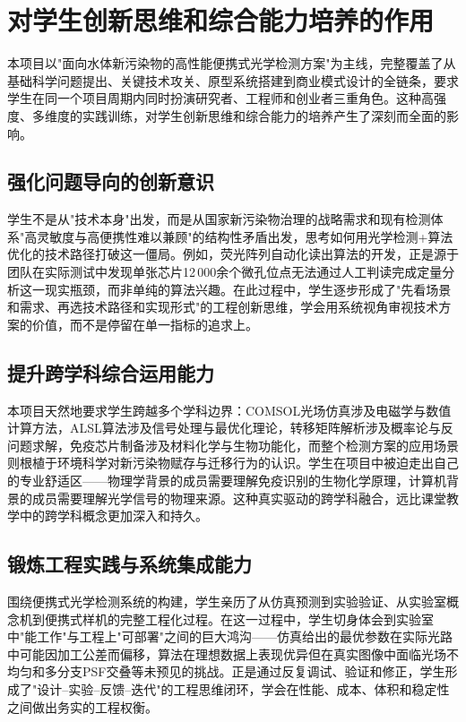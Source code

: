 \documentclass[12pt,a4paper]{article}
\begin{document}
\section{对学生创新思维和综合能力培养的作用}

本项目以"面向水体新污染物的高性能便携式光学检测方案"为主线，完整覆盖了从基础科学问题提出、关键技术攻关、原型系统搭建到商业模式设计的全链条，要求学生在同一个项目周期内同时扮演研究者、工程师和创业者三重角色。这种高强度、多维度的实践训练，对学生创新思维和综合能力的培养产生了深刻而全面的影响。

\subsection{强化问题导向的创新意识}

学生不是从"技术本身"出发，而是从国家新污染物治理的战略需求和现有检测体系"高灵敏度与高便携性难以兼顾"的结构性矛盾出发，思考如何用光学检测+算法优化的技术路径打破这一僵局。例如，荧光阵列自动化读出算法的开发，正是源于团队在实际测试中发现单张芯片12\,000余个微孔位点无法通过人工判读完成定量分析这一现实瓶颈，而非单纯的算法兴趣。在此过程中，学生逐步形成了"先看场景和需求、再选技术路径和实现形式"的工程创新思维，学会用系统视角审视技术方案的价值，而不是停留在单一指标的追求上。

\subsection{提升跨学科综合运用能力}

本项目天然地要求学生跨越多个学科边界：COMSOL光场仿真涉及电磁学与数值计算方法，ALSL算法涉及信号处理与最优化理论，转移矩阵解析涉及概率论与反问题求解，免疫芯片制备涉及材料化学与生物功能化，而整个检测方案的应用场景则根植于环境科学对新污染物赋存与迁移行为的认识。学生在项目中被迫走出自己的专业舒适区——物理学背景的成员需要理解免疫识别的生物化学原理，计算机背景的成员需要理解光学信号的物理来源。这种真实驱动的跨学科融合，远比课堂教学中的跨学科概念更加深入和持久。

\subsection{锻炼工程实践与系统集成能力}

围绕便携式光学检测系统的构建，学生亲历了从仿真预测到实验验证、从实验室概念机到便携式样机的完整工程化过程。在这一过程中，学生切身体会到实验室中"能工作"与工程上"可部署"之间的巨大鸿沟——仿真给出的最优参数在实际光路中可能因加工公差而偏移，算法在理想数据上表现优异但在真实图像中面临光场不均匀和多分支PSF交叠等未预见的挑战。正是通过反复调试、验证和修正，学生形成了"设计--实验--反馈--迭代"的工程思维闭环，学会在性能、成本、体积和稳定性之间做出务实的工程权衡。
\end{document}
